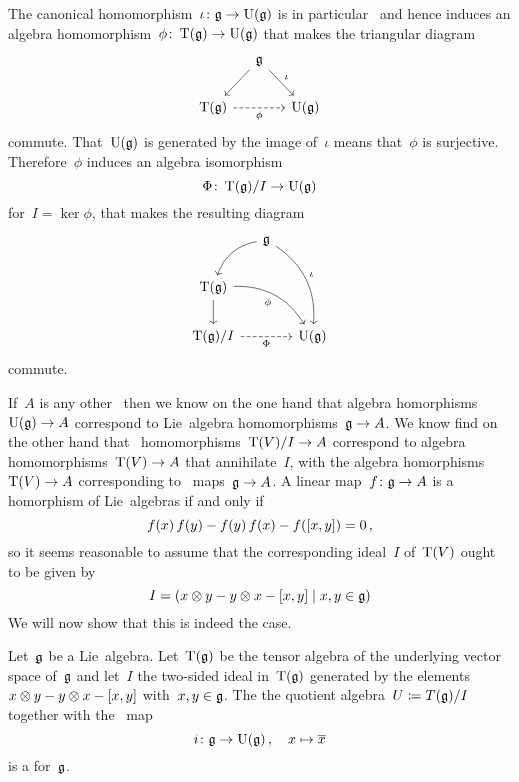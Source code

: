 \begin{remark}
  The canonical homomorphism~$\iota \colon \mathfrak{g} \to \operatorname{U}(\mathfrak{g})$ is in particular~{\linear{$\kf$}} and hence induces an algebra homomorphism~$\phi \colon \operatorname{T}(\mathfrak{g}) \to \operatorname{U}(\mathfrak{g})$ that makes the triangular diagram
  \[
    \begin{tikzcd}[column sep = small]
      {}
      &
      \glie
      \arrow{dl}
      \arrow{dr}[above right]{\iota}
      &
      {}
      \\
      \Tensor(\glie)
      \arrow[dashed]{rr}[below]{\phi}
      &
      {}
      &
      \Univ(\glie)
    \end{tikzcd}
  \]
  commute.
  That~$\operatorname{U}(\mathfrak{g})$ is generated by the image of~$\iota$ means that~$\phi$ is surjective.
  Therefore~$\phi$ induces an algebra isomorphism
  \[
    \Phi
    \colon
    \operatorname{T}(\mathfrak{g})/I
    \to
    \operatorname{U}(\mathfrak{g})
  \]
  for~$I = \ker \phi$, that makes the resulting diagram
   \[
    \begin{tikzcd}[column sep = small]
      {}
      &
      \glie
      \arrow[bend right]{dl}
      \arrow[bend left]{ddr}[above right]{\iota}
      &
      {}
      \\
      \Tensor(\glie)
      \arrow[bend left]{drr}[below left]{\phi}
      \arrow{d}
      &
      {}
      &
      {}
      \\
      \Tensor(\glie)/I
      \arrow[dashed]{rr}[below]{\Phi}
      &
      {}
      &
      \Univ(\glie)
    \end{tikzcd}
  \]
  commute.
  
  If~$A$ is any other~{\algebra{$\kf$}} then we know on the one hand that algebra homorphisms~$\operatorname{U}(\mathfrak{g}) \to A$ correspond to Lie~algebra homomorphisms~$\mathfrak{g} \to A$.
  We know find on the other hand that~{\algebra{$\kf$}} homomorphisms~$\operatorname{T}(V)/I \to A$ correspond to algebra homomorphisms~$\operatorname{T}(V) \to A$ that annihilate~$I$, with the algebra homorphisms~$\operatorname{T}(V) \to A$ corresponding to~{\linear{$\kf$}} maps~$\mathfrak{g} \to A$.
  A linear map~$f \colon \mathfrak{g} \to A$ is a homorphism of Lie~algebras if and only if
  \[
      f(x) \, f(y)
    - f(y) \, f(x)
    - f([x,y])
    =
    0 \,,
  \]
  so it seems reasonable to assume that the corresponding ideal~$I$ of~$\operatorname{T}(V)$ ought to be given by
  \[
    I
    =
    (x \tensor y - y \tensor x - [x,y] \suchthat x, y \in \glie)
  \]
  We will now show that this is indeed the case.
\end{remark}


\begin{proposition}
  Let~$\mathfrak{g}$ be a Lie~algebra.
  Let~$\operatorname{T}(\mathfrak{g})$ be the tensor algebra of the underlying vector space of~$\mathfrak{g}$ and let~$I$ the two-sided ideal in~$\operatorname{T}(\mathfrak{g})$ generated by the elements $x \otimes y - y \otimes x - [x,y]$ with~$x,y \in \mathfrak{g}$.
  The the quotient algebra~$U \coloneqq T(\mathfrak{g})/I$ together with the~{\linear{$\kf$}} map
  \[
    i
    \colon
    \mathfrak{g}
    \to
    \operatorname{U}(\mathfrak{g}) \,,
    \quad
    x
    \mapsto
    \overline{x}
  \]
  is a {\ua} for~$\mathfrak{g}$.
\end{proposition}


